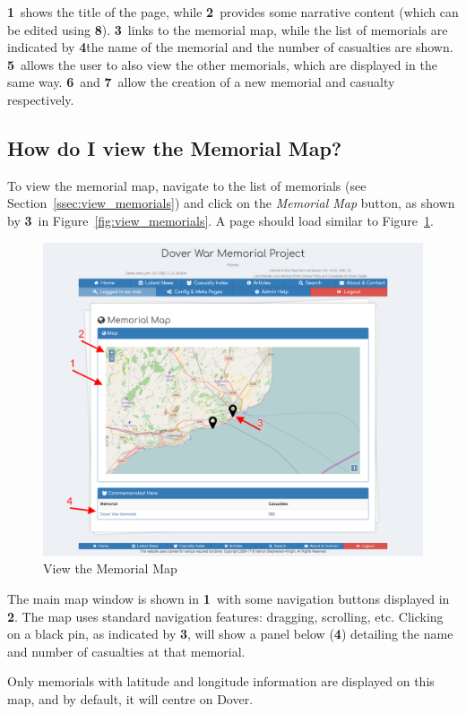\documentclass[12pt]{article}
\newcommand{\marker}[1]{\color{red}\textbf{#1}\color{black}}
\begin{document}
\marker{1}\ shows the title of the page, while \marker{2}\ provides some narrative content (which can be edited using \marker{8}). \marker{3}\ links to the memorial map, while the list of memorials are indicated by \marker{4}\. the name of the memorial and the number of casualties are shown. \marker{5}\ allows the user to also view the other memorials, which are displayed in the same way. \marker{6}\ and \marker{7}\ allow the creation of a new memorial and casualty respectively.

\newpage
\FloatBarrier
\subsection{How do I view the Memorial Map?}
To view the memorial map, navigate to the list of memorials (see Section~\ref{ssec:view_memorials}) and click on the \textit{Memorial Map} button, as shown by \marker{3}\ in Figure~\ref{fig:view_memorials}. A page should load similar to Figure~\ref{fig:view_map}.

\begin{figure}[h]
  \centering
 \includegraphics[width=.9\textwidth]{pics/view_map.png}
	\caption{View the Memorial Map}\label{fig:view_map}
\end{figure}

The main map window is shown in \marker{1}\ with some navigation buttons displayed in \marker{2}. The map uses standard navigation features: dragging, scrolling, etc. Clicking on a black pin, as indicated by \marker{3}, will show a panel below (\marker{4}) detailing the name and number of casualties at that memorial.
\begin{infoBox}
Only memorials with latitude and longitude information are displayed on this map, and by default, it will centre on Dover.
\end{infoBox}
\end{document}
